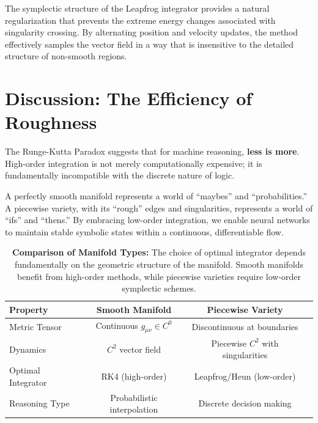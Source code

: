 \documentclass[12pt,a4paper]{article}
\begin{document}
The symplectic structure of the Leapfrog integrator provides a natural regularization that prevents the extreme energy changes associated with singularity crossing. By alternating position and velocity updates, the method effectively samples the vector field in a way that is insensitive to the detailed structure of non-smooth regions.

\section{Discussion: The Efficiency of Roughness}

The Runge-Kutta Paradox suggests that for machine reasoning, \textbf{less is more}. High-order integration is not merely computationally expensive; it is fundamentally incompatible with the discrete nature of logic.

A perfectly smooth manifold represents a world of ``maybes'' and ``probabilities.'' A piecewise variety, with its ``rough'' edges and singularities, represents a world of ``ifs'' and ``thens.'' By embracing low-order integration, we enable neural networks to maintain stable symbolic states within a continuous, differentiable flow.

\begin{table}[htbp]
\centering
\begin{tabular}{@{}lccc@{}}
\toprule
\textbf{Property} & \textbf{Smooth Manifold} & \textbf{Piecewise Variety} \\
\midrule
Metric Tensor & Continuous $g_{\mu\nu} \in C^0$ & Discontinuous at boundaries \\
Dynamics & $C^2$ vector field & Piecewise $C^2$ with singularities \\
Optimal Integrator & RK4 (high-order) & Leapfrog/Heun (low-order) \\
Reasoning Type & Probabilistic interpolation & Discrete decision making \\
\bottomrule
\end{tabular}
\caption{\textbf{Comparison of Manifold Types:} The choice of optimal 
         integrator depends fundamentally on the geometric structure 
         of the manifold. Smooth manifolds benefit from high-order methods, 
         while piecewise varieties require low-order symplectic schemes.}
\label{tab:manifold_comparison}
\end{table}
\end{document}
